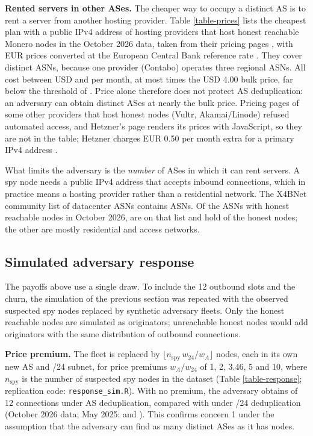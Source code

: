 \documentclass[english]{mrl}
\theoremstyle{plain}
\begin{document}
\textbf{Rented servers in other ASes.} The cheaper way to occupy a distinct AS is to rent a server from another hosting provider. Table \ref{table-prices} lists the cheapest plan with a public IPv4 address of \nPriceProviders{} hosting providers that host honest reachable Monero nodes in the October 2026 data, taken from their pricing pages \cite{PricePages,DOPricing}, with EUR prices converted at the European Central Bank reference rate \cite{ECB20261005}. They cover \nPriceAsns{} distinct ASNs, because one provider (Contabo) operates three regional ASNs. All \nPriceAsns{} cost between USD \priceMin{} and \priceMax{} per month, at most \priceMaxRatio{} times the USD 4.00 bulk price, far below the threshold of \thresholdNew. Price alone therefore does not protect AS deduplication: an adversary can obtain distinct ASes at nearly the bulk price. Pricing pages of some other providers that host honest nodes (Vultr, Akamai/Linode) refused automated access, and Hetzner's page renders its prices with JavaScript, so they are not in the table; Hetzner charges EUR 0.50 per month extra for a primary IPv4 address \cite{HetznerIPv4}.



What limits the adversary is the \emph{number} of ASes in which it can rent servers. A spy node needs a public IPv4 address that accepts inbound connections, which in practice means a hosting provider rather than a residential network. The X4BNet community list of datacenter ASNs \cite{X4BDatacenter} contains \nDcList{} ASNs. Of the \hAsnNew{} ASNs with honest reachable nodes in October 2026, \nHonestDcAsn{} are on that list and hold \nHonestDcNodes{} of the \nHonestNew{} honest nodes; the other \nHonestNonDcAsn{} are mostly residential and access networks.

\subsection{Simulated adversary response\label{sec:response}}

The payoffs above use a single draw. To include the 12 outbound slots and the churn, the simulation of the previous section was repeated with the observed suspected spy nodes replaced by synthetic adversary fleets. Only the honest reachable nodes are simulated as originators; unreachable honest nodes would add originators with the same distribution of outbound connections.

\textbf{Price premium.} The fleet is replaced by $\lfloor n_{\mathrm{spy}}\, w_{24}/w_{A} \rfloor$ nodes, each in its own new AS and /24 subnet, for price premiums $w_{A}/w_{24}$ of 1, 2, 3.46, 5 and 10, where $n_{\mathrm{spy}}$ is the number of suspected spy nodes in the dataset (Table \ref{table-response}; replication code: \texttt{response\_sim.R}). With no premium, the adversary obtains \respAsmapROneNew{} of 12 connections under AS deduplication, compared with \respSubnetROneNew{} under /24 deduplication (October 2026 data; May 2025: \respAsmapROneOld{} and \respSubnetROneOld{}). This confirms concern 1 under the assumption that the adversary can find as many distinct ASes as it has nodes.
\end{document}

